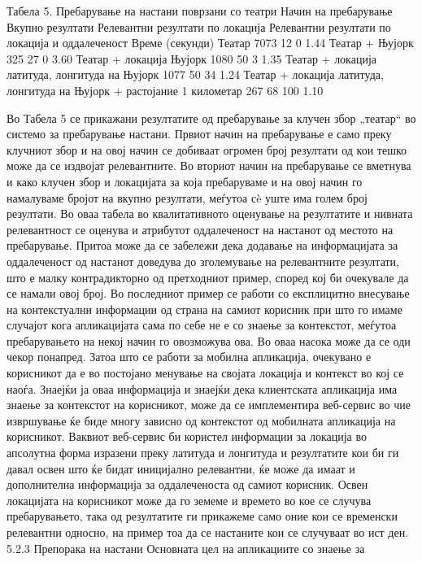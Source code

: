 Табела 5. Пребарување на настани поврзани со театри Начин на пребарување   
Вкупно резултати    Релевантни резултати по локација    Релевантни резултати по
локација и оддалеченост Време (секунди) Театар  7073    12  0   1.44 Театар +
Њујорк 325 27  0   3.60 Театар + локација Њујорк    1080    50  3   1.35 Театар
+ локација латитуда, лонгитуда на Њујорк 1077    50  34  1.24 Театар + локација
латитуда, лонгитуда на Њујорк + растојание 1 километар    267 68  100 1.10

Во Табела 5 се прикажани резултатите од пребарување за клучен збор „театар“ во
системо за пребарување настани. Првиот начин на пребарување е само преку
клучниот збор и на овој начин се добиваат огромен број резултати од кои тешко
може да се издвојат релевантните. Во вториот начин на пребарување се вметнува и
како клучен збор и локацијата за која пребаруваме и на овој начин го намалуваме
бројот на вкупно резултати, меѓутоа сè уште има голем број резултати. Во оваа
табела во квалитативното оценување на резултатите и нивната релевантност се
оценува и атрибутот оддалеченост на настанот од местото на пребарување. Притоа
може да се забележи дека додавање на информацијата за оддалеченост од настанот
доведува до зголемување на релевантните резултати, што е малку контрадикторно од
претходниот пример, според кој би очекувале да се намали овој број. Во
последниот пример се работи со експлицитно внесување на контекстуални информации
од страна на самиот корисник при што го имаме случајот кога апликацијата сама по
себе не е со знаење за контекстот, меѓутоа пребарувањето на некој начин го
овозможува ова. Во оваа насока може да се оди чекор понапред. Затоа што се
работи за мобилна апликација, очекувано е корисникот да е во постојано менување
на својата локација и контекст во кој се наоѓа. Знаејќи ја оваа информација и
знаејќи дека клиентската апликација има знаење за контекстот на корисникот, може
да се имплементира веб-сервис во чие извршување ќе биде многу зависно од
контекстот од мобилната апликација на корисникот. Ваквиот веб-сервис би користел
информации за локација во апсолутна форма изразени преку латитуда и лонгитуда и
резултатите кои би ги давал освен што ќе бидат иницијално релевантни, ќе може да
имаат и дополнителна информација за оддалеченоста од самиот корисник. Освен
локацијата на корисникот може да го земеме и времето во кое се случува
пребарувањето, така од резултатите ги прикажеме само оние кои се временски
релевантни односно, на пример тоа да се настаните кои се случуваат во ист ден.
5.2.3   Препорака на настани Основната цел на апликациите со знаење за
